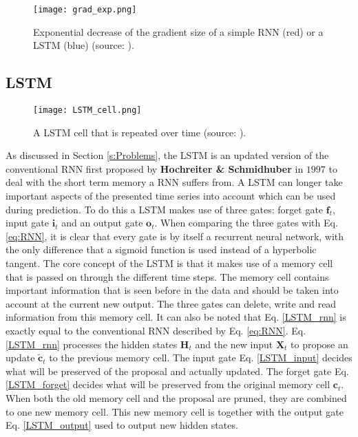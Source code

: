 \begin{figure}[h!]
	\centering
	\texttt{[image: grad\_exp.png]}
	\caption{Exponential decrease of the gradient size of a simple RNN (red) or a LSTM (blue) (source: \cite{Teuwen2019}).}
	\label{fig:grad_exp}
\end{figure}


\subsection{LSTM}\label{s:LSTM}

\begin{figure}[ht]
	\centering
	\texttt{[image: LSTM\_cell.png]}
	\caption{A LSTM cell that is repeated over time (source: \cite{Olah}).}
	\label{fig:LSTM_cell}
\end{figure}

As discussed in Section \ref{s:Problems}, the LSTM is an updated version of the conventional RNN first proposed by \textbf{Hochreiter \& Schmidhuber} in $ 1997 $ to deal with the short term memory a RNN suffers from. A LSTM can longer take important aspects of the presented time series into account which can be used during prediction. To do this a LSTM makes use of three gates: forget gate $ \textbf{f}_t $, input gate $ \textbf{i}_t $ and an output gate $ \textbf{o}_t $. When comparing the three gates with Eq. \ref{eq:RNN}, it is clear that every gate is by itself a recurrent neural network, with the only difference that a sigmoid function is used instead of a hyperbolic tangent. The core concept of the LSTM is that it makes use of a memory cell that is passed on through the different time steps. The memory cell contains important information that is seen before in the data and should be taken into account at the current new output. The three gates can delete, write and read information from this memory cell. It can also be noted that Eq. \ref{LSTM_rnn} is exactly equal to the conventional RNN described by Eq. \ref{eq:RNN}. Eq. \ref{LSTM_rnn} processes the hidden states $ \bm{H}_t $ and the new input $ \bm{X}_t $ to propose an update $ \tilde{\textbf{c}}_t $ to the previous memory cell. The input gate Eq. \ref{LSTM_input} decides what will be preserved of the proposal and actually updated. The forget gate Eq. \ref{LSTM_forget} decides what will be preserved from the original memory cell $ \textbf{c}_t $. When both the old memory cell and the proposal are pruned, they are combined to one new memory cell. This new memory cell is together with the output gate Eq. \ref{LSTM_output} used to output new hidden states. \\

